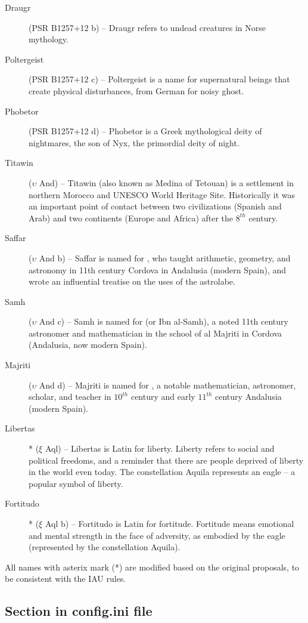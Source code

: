 \begin{description}
\item[Draugr] (PSR B1257+12 b) -- Draugr refers to undead creatures in Norse mythology.
\item[Poltergeist] (PSR B1257+12 c) -- Poltergeist is a name for supernatural beings that create physical disturbances, from German for noisy ghost.
\item[Phobetor] (PSR B1257+12 d) -- Phobetor is a Greek mythological deity of nightmares, the son of Nyx, the primordial deity of night.
\item[Titawin] ($\upsilon$ And) -- Titawin (also known as Medina of Tetouan) is a settlement in northern Morocco and UNESCO World Heritage Site. Historically it was an important point of contact between two civilizations (Spanish and Arab) and two continents (Europe and Africa) after the $8^{th}$ century.
\item[Saffar] ($\upsilon$ And b) -- Saffar is named for , who taught arithmetic, geometry, and astronomy in 11th century Cordova in Andalusia (modern Spain), and wrote an influential treatise on the uses of the astrolabe.
\item[Samh] ($\upsilon$ And c) -- Samh is named for  (or Ibn al-Samh), a noted 11th century astronomer and mathematician in the school of al Majriti in Cordova (Andalusia, now modern Spain).
\item[Majriti] ($\upsilon$ And d) -- Majriti is named for , a notable mathematician, astronomer, scholar, and teacher in $10^{th}$ century and early $11^{th}$ century Andalusia (modern Spain).
\item[Libertas]* ($\xi$ Aql) -- Libertas is Latin for liberty. Liberty refers to social and political freedoms, and a reminder that there are people deprived of liberty in the world even today. The constellation Aquila represents an eagle -- a popular symbol of liberty.
\item[Fortitudo]* ($\xi$ Aql b) -- Fortitudo is Latin for fortitude. Fortitude means emotional and mental strength in the face of adversity, as embodied by the eagle (represented by the constellation Aquila).
\end{description}

All names with asterix mark (*) are modified based on the original proposals, to be consistent with the IAU rules.


\subsection{Section  in config.ini file}

